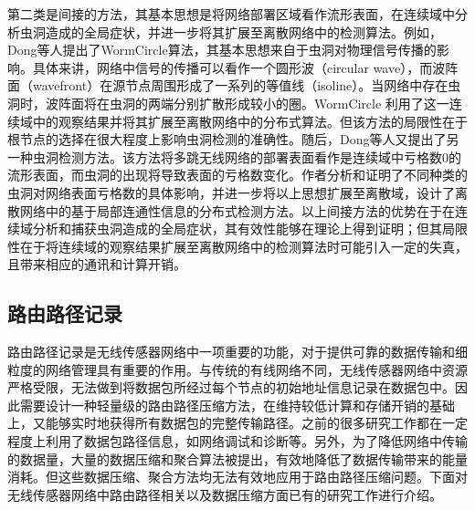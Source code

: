 第二类是间接的方法，其基本思想是将网络部署区域看作流形表面，在连续域中分析虫洞造成的全局症状，并进一步将其扩展至离散网络中的检测算法。例如，Dong等人提出了WormCircle算法，其基本思想来自于虫洞对物理信号传播的影响。具体来讲，网络中信号的传播可以看作一个圆形波（circular wave），而波阵面（wavefront）在源节点周围形成了一系列的等值线（isoline）。当网络中存在虫洞时，波阵面将在虫洞的两端分别扩散形成较小的圈。WormCircle 利用了这一连续域中的观察结果并将其扩展至离散网络中的分布式算法。但该方法的局限性在于根节点的选择在很大程度上影响虫洞检测的准确性。随后，Dong等人又提出了另一种虫洞检测方法。该方法将多跳无线网络的部署表面看作是连续域中亏格数0的流形表面，而虫洞的出现将导致表面的亏格数变化。作者分析和证明了不同种类的虫洞对网络表面亏格数的具体影响，并进一步将以上思想扩展至离散域，设计了离散网络中的基于局部连通性信息的分布式检测方法。以上间接方法的优势在于在连续域分析和捕获虫洞造成的全局症状，其有效性能够在理论上得到证明；但其局限性在于将连续域的观察结果扩展至离散网络中的检测算法时可能引入一定的失真，且带来相应的通讯和计算开销。
\subsection{路由路径记录}
路由路径记录是无线传感器网络中一项重要的功能，对于提供可靠的数据传输和细粒度的网络管理具有重要的作用。与传统的有线网络不同，无线传感器网络中资源严格受限，无法做到将数据包所经过每个节点的初始地址信息记录在数据包中。因此需要设计一种轻量级的路由路径压缩方法，在维持较低计算和存储开销的基础上，又能够实时地获得所有数据包的完整传输路径。之前的很多研究工作都在一定程度上利用了数据包路径信息，如网络调试和诊断等。另外，为了降低网络中传输的数据量，大量的数据压缩和聚合算法被提出，有效地降低了数据传输带来的能量消耗。但这些数据压缩、聚合方法均无法有效地应用于路由路径压缩问题。下面对无线传感器网络中路由路径相关以及数据压缩方面已有的研究工作进行介绍。

